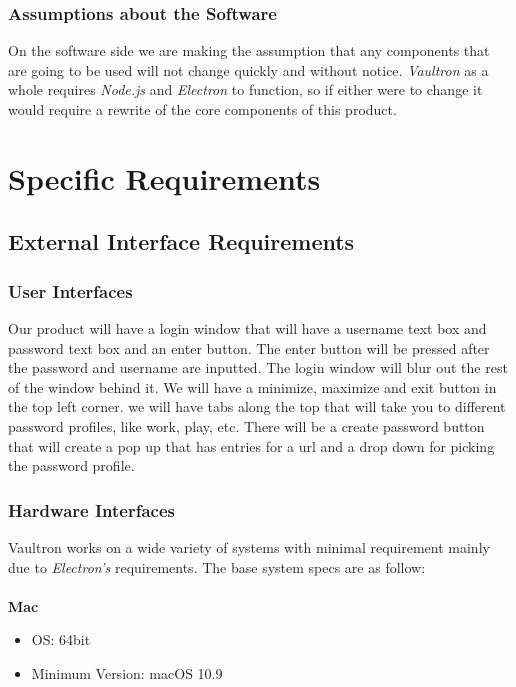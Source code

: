 \documentclass[11pt]{report}
\begin{document}
\subsection{Assumptions about the Software}
On the software side we are making the assumption that any components that are
going to be used will not change quickly and without notice. \textit{Vaultron} 
as a whole requires \textit{Node.js} and \textit{Electron} to function, so if 
either were to change it would require a rewrite of the core components of 
this product.



\chapter{Specific Requirements}

\section{External Interface Requirements}

\subsection{User Interfaces}
Our product will have a login window that will have a username text box and password
text box and an enter button. The enter button will be pressed after the password 
and username are inputted. The login window will blur out the rest of the window
behind it.
We will have a minimize, maximize  and exit button in the top left corner. 
we will have tabs along the top that will take you to different password profiles,
like work, play, etc. 
There will be a create password button that will create a pop up that has entries
for a url and a drop down for picking the password profile. 

\subsection{Hardware Interfaces}
Vaultron works on a wide variety of systems with minimal requirement 
mainly due to \textit{Electron's} requirements. The base system specs are as follow:
\\ \\ 
\textbf{Mac}
\begin{itemize}
    \item OS: 64bit
    \item Minimum Version: macOS 10.9
\end{itemize}
\end{document}
